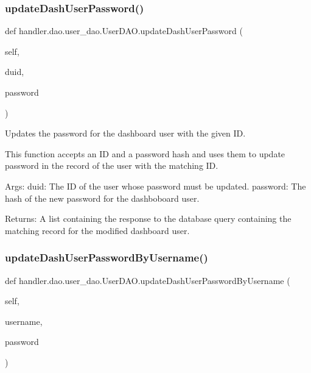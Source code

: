 \subsubsection{\texorpdfstring{update\+Dash\+User\+Password()}{updateDashUserPassword()}}
{\footnotesize\ttfamily def handler.\+dao.\+user\+\_\+dao.\+User\+D\+A\+O.\+update\+Dash\+User\+Password (\begin{DoxyParamCaption}\item[{}]{self,  }\item[{}]{duid,  }\item[{}]{password }\end{DoxyParamCaption})}

\begin{DoxyVerb}Updates the password for the dashboard user with the given ID.

This function accepts an ID and a password hash and uses them 
to update password in the record of the user with the matching ID.

Args:
    duid: The ID of the user whose password must be updated.
    password: The hash of the new password for the dashboboard user.

Returns:
    A list containing the response to the database query
    containing the matching record for the modified dashboard user.
\end{DoxyVerb}
 \mbox{\label{classhandler_1_1dao_1_1user__dao_1_1_user_d_a_o_a2defb0680d461acabaf05daf03214938}} 
\subsubsection{\texorpdfstring{update\+Dash\+User\+Password\+By\+Username()}{updateDashUserPasswordByUsername()}}
{\footnotesize\ttfamily def handler.\+dao.\+user\+\_\+dao.\+User\+D\+A\+O.\+update\+Dash\+User\+Password\+By\+Username (\begin{DoxyParamCaption}\item[{}]{self,  }\item[{}]{username,  }\item[{}]{password }\end{DoxyParamCaption})}

